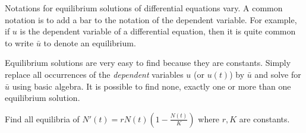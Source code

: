 \documentclass[../main.tex]{subfiles}
\begin{document}
Notations for equilibrium solutions of differential equations vary. A common notation is to add a bar  to the notation of the dependent variable. For example, if \(u\) is the dependent variable of a differential equation, then it is quite common to write \(\bar{u}\) to denote an equilibrium. 

\faStar{} Equilibrium solutions are very easy to find because they are constants. Simply replace all occurrences of the \emph{dependent} variables \(u\) (or \(u(t)\)) by \(\bar{u}\) and solve for \(\bar{u}\) using basic algebra. It is possible to find none, exactly one or more than one equilibrium solution.

\begin{example} \label{eg:equilibria-logistic}
  Find all equilibria of \(N'(t) = r N(t) \left(1 - \frac{N(t)}{K}\right)\) where \(r,K\) are constants.

  \blanks*
\end{example}
\clearpage

%
%
%


%
%
%

\end{document}
